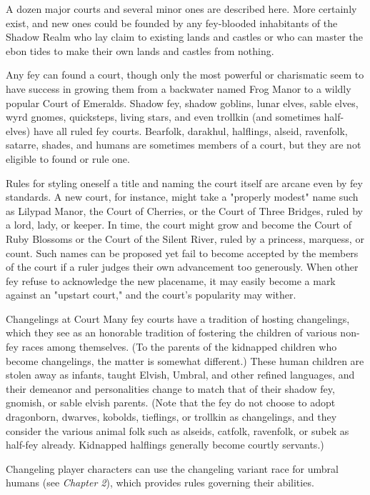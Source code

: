 \documentclass[10pt,a4paper,twoside,bg=print,twocolumn,openany,nodeprecatedcode]{dndbook}
\begin{document}
A dozen major courts and several minor ones are described here. More certainly exist, and new ones could be founded by any fey-blooded inhabitants of the Shadow Realm who lay claim to existing lands and castles or who can master the ebon tides to make their own lands and castles from nothing.

Any fey can found a court, though only the most powerful or charismatic seem to have success in growing them from a backwater named Frog Manor to a wildly popular Court of Emeralds. Shadow fey, shadow goblins, lunar elves, sable elves, wyrd gnomes, quicksteps, living stars, and even trollkin (and sometimes half-elves) have all ruled fey courts. Bearfolk, darakhul, halflings, alseid, ravenfolk, satarre, shades, and humans are sometimes members of a court, but they are not eligible to found or rule one.

Rules for styling oneself a title and naming the court itself are arcane even by fey standards. A new court, for instance, might take a "properly modest" name such as Lilypad Manor, the Court of Cherries, or the Court of Three Bridges, ruled by a lord, lady, or keeper. In time, the court might grow and become the Court of Ruby Blossoms or the Court of the Silent River, ruled by a princess, marquess, or count. Such names can be proposed yet fail to become accepted by the members of the court if a ruler judges their own advancement too generously. When other fey refuse to acknowledge the new placename, it may easily become a mark against an "upstart court," and the court's popularity may wither.

\begin{DndSidebar}[float=!b]{Changelings at Court}
Many fey courts have a tradition of hosting changelings, which they see as an honorable tradition of fostering the children of various non-fey races among themselves. (To the parents of the kidnapped children who become changelings, the matter is somewhat different.) These human children are stolen away as infants, taught Elvish, Umbral, and other refined languages, and their demeanor and personalities change to match that of their shadow fey, gnomish, or sable elvish parents. (Note that the fey do not choose to adopt dragonborn, dwarves, kobolds, tieflings, or trollkin as changelings, and they consider the various animal folk such as alseids, catfolk, ravenfolk, or subek as half-fey already. Kidnapped halflings generally become courtly servants.)



Changeling player characters can use the changeling variant race for umbral humans (see \textit{Chapter 2}), which provides rules governing their abilities.



\end{DndSidebar}
\end{document}
